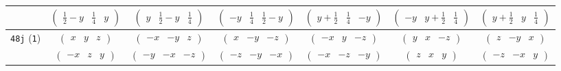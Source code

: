 \documentclass[fleqn,9pt,landscape]{jsarticle}
\begin{document}
\begin{center}
\begin{longtable}{ccccccc}
& $ \begin{pmatrix} \frac{1}{2} - y & \frac{1}{4} & y \end{pmatrix} $ & $ \begin{pmatrix} y & \frac{1}{2} - y & \frac{1}{4} \end{pmatrix} $ & $ \begin{pmatrix} - y & \frac{1}{4} & \frac{1}{2} - y \end{pmatrix} $ & $ \begin{pmatrix} y + \frac{1}{2} & \frac{1}{4} & - y \end{pmatrix} $ & $ \begin{pmatrix} - y & y + \frac{1}{2} & \frac{1}{4} \end{pmatrix} $ & $ \begin{pmatrix} y + \frac{1}{2} & y & \frac{1}{4} \end{pmatrix} $ \\ \hline
{\tt 48j} ({\tt 1}) & $ \begin{pmatrix} x & y & z \end{pmatrix} $ & $ \begin{pmatrix} - x & - y & z \end{pmatrix} $ & $ \begin{pmatrix} x & - y & - z \end{pmatrix} $ & $ \begin{pmatrix} - x & y & - z \end{pmatrix} $ & $ \begin{pmatrix} y & x & - z \end{pmatrix} $ & $ \begin{pmatrix} z & - y & x \end{pmatrix} $ \\
& $ \begin{pmatrix} - x & z & y \end{pmatrix} $ & $ \begin{pmatrix} - y & - x & - z \end{pmatrix} $ & $ \begin{pmatrix} - z & - y & - x \end{pmatrix} $ & $ \begin{pmatrix} - x & - z & - y \end{pmatrix} $ & $ \begin{pmatrix} z & x & y \end{pmatrix} $ & $ \begin{pmatrix} - z & - x & y \end{pmatrix} $ \\

\end{longtable}
\end{center}
\end{document}
